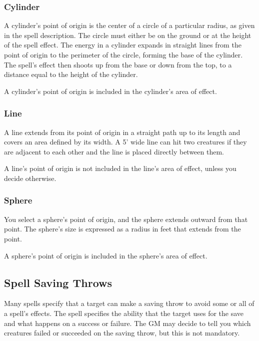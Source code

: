 \subsubsection{Cylinder}

A cylinder's point of origin is the center of a circle of a particular radius, as given in the spell description. The circle must either be on the ground or at the height of the spell effect. The energy in a cylinder expands in straight lines from the point of origin to the perimeter of the circle, forming the base of the cylinder. The spell's effect then shoots up from the base or down from the top, to a distance equal to the height of the cylinder.

A cylinder's point of origin is included in the cylinder's area of effect.

\subsubsection{Line}

A line extends from its point of origin in a straight path up to its length and covers an area defined by its width. A 5' wide line can hit two creatures if they are adjacent to each other and the line is placed directly between them.

A line's point of origin is not included in the line's area of effect, unless you decide otherwise.

\subsubsection{Sphere}

You select a sphere's point of origin, and the sphere extends outward from that point. The sphere's size is expressed as a radius in feet that extends from the point.

A sphere's point of origin is included in the sphere's area of effect.

\subsection{Spell Saving Throws}

Many spells specify that a target can make a saving throw to avoid some or all of a spell's effects. The spell specifies the ability that the target uses for the save and what happens on a success or failure. The GM may decide to tell you which creatures failed or succeeded on the saving throw, but this is not mandatory.

